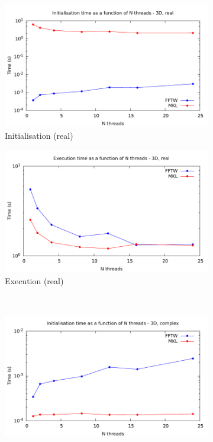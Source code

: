 \documentclass[12pt, a4paper]{article} \setlength{\textheight}{24cm}
\begin{document}
\begin{figure}[H]
  \captionsetup{width=0.8\linewidth}
  \centering
  \begin{subfigure}{.5\textwidth}
    \centering
    \includegraphics[width=.9\linewidth]{graphs/3d-multh-init-r.pdf}
    \caption{Initialisation (real)}
    \label{3DMULTHRI}
  \end{subfigure}%
  \begin{subfigure}{.5\textwidth}
    \centering
    \includegraphics[width=.9\linewidth]{graphs/3d-multh-exec-r.pdf}
    \caption{Execution (real)}
    \label{3DMULTHRE}
  \end{subfigure}\\
  \begin{subfigure}{.5\textwidth}
    \centering
    \includegraphics[width=.9\linewidth]{graphs/3d-multh-init-c.pdf}

\end{subfigure}
\end{figure}
\end{document}
